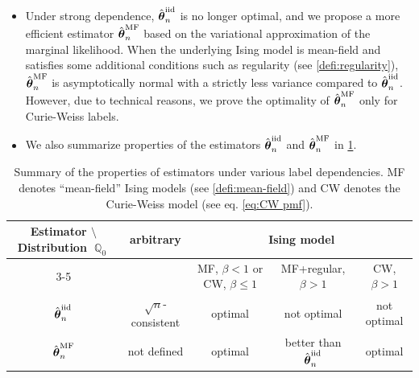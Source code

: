 \documentclass[preprint,reqno]{imsart}
\DeclareMathOperator{\QQ}{\mathbb{Q}}
\newcommand{\thetaiid}{\hat{\boldsymbol \theta}^{\text{iid}}_{\mathnormal n}}
\newcommand{\thetamf}{\hat{\boldsymbol \theta}^{\text{MF}}_{\mathnormal n}}
\begin{document}
\begin{itemize}[itemsep = 0.5em]
    \item Under strong dependence, $\thetaiid$ is no longer optimal, and we propose a more efficient estimator $\thetamf$ based on the variational approximation of the marginal likelihood.
    When the underlying Ising model is mean-field and satisfies some additional conditions such as regularity (see \cref{defi:regularity}), $\thetamf$ is asymptotically normal with a strictly less variance compared to $\thetaiid$.
    However, due to technical reasons, we prove the optimality of $\thetamf$ only for Curie-Weiss labels.

    \item We also summarize properties of the estimators $\thetaiid$ and $\thetamf$ in \cref{tab:estimators summary}.
\end{itemize}



\begin{table}[h!]
\centering
\caption{Summary of the properties of estimators under various label dependencies. MF denotes ``mean-field'' Ising models (see \cref{defi:mean-field}) and CW denotes the Curie-Weiss model (see eq. \eqref{eq:CW pmf}).}
\begin{tabular}{c|cccc}
\toprule
\multirow{2}{*}{Estimator $\setminus$ Distribution $\QQ_0$} & \multirow{2}{*}{arbitrary} & \multicolumn{3}{c}{Ising model}
\\ \cmidrule{3-5}
                           &                                          & MF, $\beta <1$ or CW, $\beta \le 1$ & MF+regular, $\beta > 1$ &  CW, $\beta > 1$ \\
    \midrule
        $\thetaiid$ & $\sqrt{n}$-consistent & optimal & not optimal & not optimal \\
        $\thetamf$ & not defined & optimal & better than $\thetaiid$ & optimal \\
        \bottomrule
\end{tabular}
    \label{tab:estimators summary}
\end{table}
\end{document}

